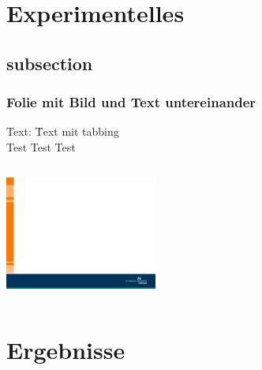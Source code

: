 \section{Experimentelles}
\subsection{subsection}
\begin{frame}
\frametitle{Folie mit Bild und Text untereinander}
\begin{tabbing}
	Text: \qquad \= Text mit tabbing\\
	\> Test Test Test\\
\end{tabbing}
	\vskip5mm
	\begin{columns}
		\column{12cm}
		\centering
		\includegraphics[width=5.0cm]{style/images/master_background}\\
	\end{columns}
\end{frame}

\section{Ergebnisse}
